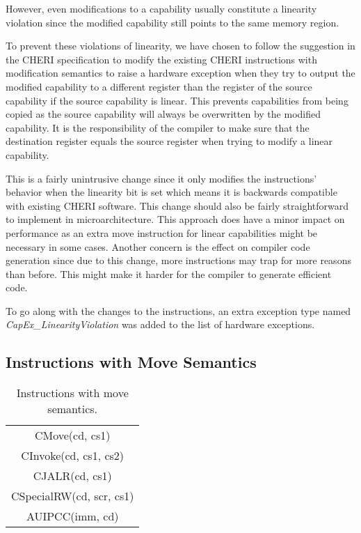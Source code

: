 However, even modifications to a capability usually constitute a linearity violation since the modified capability still points to the same memory region.

To prevent these violations of linearity, we have chosen to follow the suggestion in the CHERI specification to modify the existing CHERI instructions with modification semantics to raise a hardware exception when they try to output the modified capability to a different register than the register of the source capability if the source capability is linear. This prevents capabilities from being copied as the source capability will always be overwritten by the modified capability. It is the responsibility of the compiler to make sure that the destination register equals the source register when trying to modify a linear capability.

This is a fairly unintrusive change since it only modifies the instructions' behavior when the linearity bit is set which means it is backwards compatible with existing CHERI software. This change should also be fairly straightforward to implement in microarchitecture. This approach does have a minor impact on performance as an extra move instruction for linear capabilities might be necessary in some cases. Another concern is the effect on compiler code generation since due to this change, more instructions may trap for more reasons than before. This might make it harder for the compiler to generate efficient code.

To go along with the changes to the instructions, an extra exception type named \textit{CapEx\_LinearityViolation} was added to the list of hardware exceptions.

\subsection{Instructions with Move Semantics}
\begin{table}[h]
\centering
\begin{tabular}{| c |}
\hline
 CMove(cd, cs1) \\
 CInvoke(cd, cs1, cs2) \\
 CJALR(cd, cs1) \\
 CSpecialRW(cd, scr, cs1) \\
 AUIPCC(imm, cd) \\
\hline
\end{tabular}
\caption{Instructions with move semantics.}
\label{table:lininstmove}
\end{table}

